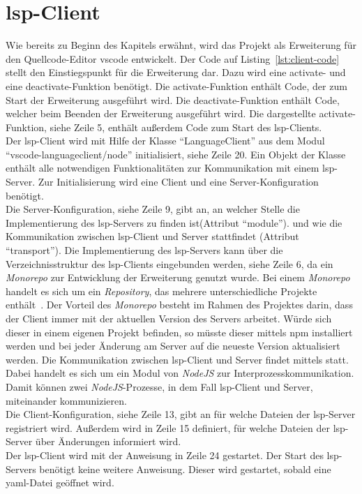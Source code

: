 \section{\acs{lsp}-Client}\label{sec:lsp-client}

Wie bereits zu Beginn des Kapitels erwähnt, wird das Projekt als Erweiterung für den Quellcode-Editor \ac{vscode} entwickelt.
Der Code auf Listing~\ref{lst:client-code} stellt den Einstiegspunkt für die Erweiterung dar.
Dazu wird eine activate- und eine deactivate-Funktion benötigt. Die activate-Funktion enthält Code, der zum Start der Erweiterung ausgeführt wird.
Die deactivate-Funktion enthält Code, welcher beim Beenden der Erweiterung ausgeführt wird.
Die dargestellte activate-Funktion, siehe Zeile 5, enthält außerdem Code zum Start des \ac{lsp}-Clients.
\\
Der \ac{lsp}-Client wird mit Hilfe der Klasse ``LanguageClient'' aus dem Modul ``vscode-languageclient/node'' initialisiert, siehe Zeile 20.
Ein Objekt der Klasse enthält alle notwendigen Funktionalitäten zur Kommunikation mit einem \ac{lsp}-Server.
Zur Initialisierung wird eine Client und eine Server-Konfiguration benötigt.
\\
Die Server-Konfiguration, siehe Zeile 9, gibt an, an welcher Stelle die Implementierung des \ac{lsp}-Servers zu finden ist(Attribut ``module'').
und wie die Kommunikation zwischen \ac{lsp}-Client und Server stattfindet (Attribut ``transport'').
Die Implementierung des \ac{lsp}-Servers kann über die Verzeichnisstruktur des \ac{lsp}-Clients eingebunden werden, siehe Zeile 6, da
ein \textit{Monorepo} zur Entwicklung der Erweiterung genutzt wurde.
Bei einem \textit{Monorepo} handelt es sich um ein \textit{Repository}, das mehrere unterschiedliche Projekte enthält~\cite{monorepo-narwhal}.
Der Vorteil des \textit{Monorepo} besteht im Rahmen des Projektes darin, dass der Client immer mit der aktuellen Version des Servers arbeitet.
Würde sich dieser in einem eigenen Projekt befinden, so müsste dieser mittels \ac{npm} installiert werden und bei jeder Änderung am Server auf
die neueste Version aktualisiert werden.
Die Kommunikation zwischen \ac{lsp}-Client und Server findet mittels  statt. Dabei handelt es sich um ein Modul von \textit{NodeJS}
zur Interprozesskommunikation. Damit können zwei \textit{NodeJS}-Prozesse, in dem Fall \acs{lsp}-Client und Server, miteinander kommunizieren.
\\
Die Client-Konfiguration, siehe Zeile 13, gibt an für welche Dateien der \ac{lsp}-Server registriert wird. Außerdem wird in Zeile 15 definiert,
für welche Dateien der \ac{lsp}-Server über Änderungen informiert wird.
\\
Der \ac{lsp}-Client wird mit der Anweisung in Zeile 24 gestartet. Der Start des \ac{lsp}-Servers benötigt keine weitere Anweisung.
Dieser wird gestartet, sobald eine \ac{yaml}-Datei geöffnet wird.

